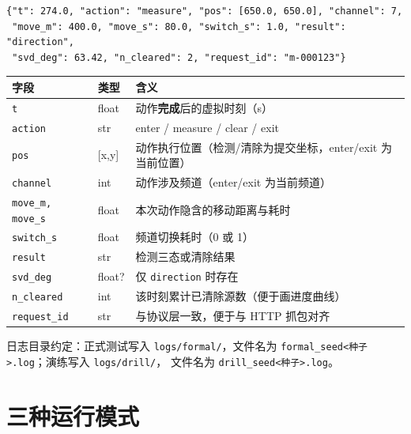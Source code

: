 \begin{lstlisting}[caption={日志行示例（measure 动作）}]
{"t": 274.0, "action": "measure", "pos": [650.0, 650.0], "channel": 7,
 "move_m": 400.0, "move_s": 80.0, "switch_s": 1.0, "result": "direction",
 "svd_deg": 63.42, "n_cleared": 2, "request_id": "m-000123"}
\end{lstlisting}

\begin{center}
\begin{tabular}{llp{8.6cm}}
\toprule
字段 & 类型 & 含义 \\ \midrule
\texttt{t} & float & 动作\textbf{完成}后的虚拟时刻（s） \\
\texttt{action} & str & enter / measure / clear / exit \\
\texttt{pos} & [x,y] & 动作执行位置（检测/清除为提交坐标，enter/exit 为当前位置） \\
\texttt{channel} & int & 动作涉及频道（enter/exit 为当前频道） \\
\texttt{move\_m, move\_s} & float & 本次动作隐含的移动距离与耗时 \\
\texttt{switch\_s} & float & 频道切换耗时（0 或 1） \\
\texttt{result} & str & 检测三态或清除结果 \\
\texttt{svd\_deg} & float? & 仅 \texttt{direction} 时存在 \\
\texttt{n\_cleared} & int & 该时刻累计已清除源数（便于画进度曲线） \\
\texttt{request\_id} & str & 与协议层一致，便于与 HTTP 抓包对齐 \\
\bottomrule
\end{tabular}
\end{center}

日志目录约定：正式测试写入 \texttt{logs/formal/}，文件名为
\texttt{formal\_\hspace{0pt}seed<种子>.log}；演练写入 \texttt{logs/drill/}，
文件名为 \texttt{drill\_\hspace{0pt}seed<种子>.log}。

\section{三种运行模式}

